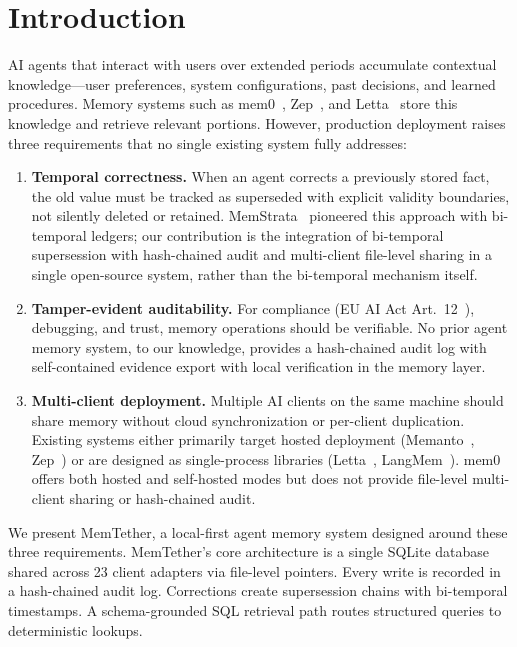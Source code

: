\documentclass{article}
\begin{document}
\section{Introduction}
\label{sec:intro}

AI agents that interact with users over extended periods accumulate contextual knowledge---user preferences, system configurations, past decisions, and learned procedures. Memory systems such as mem0~\citep{mem0}, Zep~\citep{zep}, and Letta~\citep{letta} store this knowledge and retrieve relevant portions. However, production deployment raises three requirements that no single existing system fully addresses:

\begin{enumerate}
\item \textbf{Temporal correctness.} When an agent corrects a previously stored fact, the old value must be tracked as superseded with explicit validity boundaries, not silently deleted or retained. MemStrata~\citep{memstrata} pioneered this approach with bi-temporal ledgers; our contribution is the integration of bi-temporal supersession with hash-chained audit and multi-client file-level sharing in a single open-source system, rather than the bi-temporal mechanism itself.
\item \textbf{Tamper-evident auditability.} For compliance (EU AI Act Art.~12~\citep{euaiact}), debugging, and trust, memory operations should be verifiable. No prior agent memory system, to our knowledge, provides a hash-chained audit log with self-contained evidence export with local verification in the memory layer.
\item \textbf{Multi-client deployment.} Multiple AI clients on the same machine should share memory without cloud synchronization or per-client duplication. Existing systems either primarily target hosted deployment (Memanto~\citep{memanto}, Zep~\citep{zep}) or are designed as single-process libraries (Letta~\citep{letta}, LangMem~\citep{langmem}). mem0~\citep{mem0} offers both hosted and self-hosted modes but does not provide file-level multi-client sharing or hash-chained audit.
\end{enumerate}

We present MemTether, a local-first agent memory system designed around these three requirements. MemTether's core architecture is a single SQLite database shared across 23 client adapters via file-level pointers. Every write is recorded in a hash-chained audit log. Corrections create supersession chains with bi-temporal timestamps. A schema-grounded SQL retrieval path routes structured queries to deterministic lookups.
\end{document}
